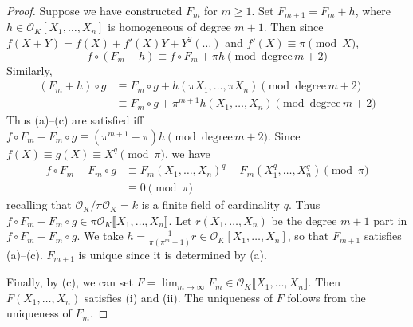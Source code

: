 \documentclass[11pt]{article}
\theoremstyle{definition}
\theoremstyle{plain}
\theoremstyle{remark}
\newcommand{\cO}{\mathcal{O}}
\begin{document}
\begin{proof}
    Suppose we have constructed $F_m$ for $m \ge 1$. Set $F_{m+1} = F_m + h$, where $h \in \cO_K[X_1, \ldots, X_n]$ is homogeneous of degree $m+1$. Then since $f(X+Y) = f(X) + f'(X) Y + Y^2 (\ldots)$ and $f'(X) \equiv \pi \pmod{X}$,
    \begin{equation*}
        f \circ (F_m + h) \equiv f \circ F_m + \pi h \pmod{\mathrm{degree}\,m+2}
    \end{equation*}
    Similarly,
    \begin{align*}
        (F_m + h) \circ g
        &\equiv F_m \circ g + h(\pi X_1, \ldots, \pi X_n) \pmod{\mathrm{degree}\,m+2}\\
        &\equiv F_m \circ g + \pi^{m+1} h(X_1, \ldots, X_n) \pmod{\mathrm{degree}\,m+2}
    \end{align*}
    Thus (a)--(c) are satisfied iff $f \circ F_m - F_m \circ g \equiv (\pi^{m+1} - \pi) h \pmod{\mathrm{degree}\,m+2}$. Since $f(X) \equiv g(X) \equiv X^q \pmod{\pi}$, we have
    \begin{align*}
        f \circ F_m - F_m \circ g
        &\equiv F_m(X_1, \ldots, X_n)^q - F_m(X_1^q, \ldots, X_n^q) \pmod{\pi}\\
        &\equiv 0 \pmod{\pi}
    \end{align*}
    recalling that $\cO_K/\pi \cO_K = k$ is a finite field of cardinality $q$. Thus $f \circ F_m - F_m \circ g \in \pi \cO_K \llbracket X_1, \ldots, X_n \rrbracket$. Let $r(X_1, \ldots, X_n)$ be the degree $m+1$ part in $f \circ F_m - F_m \circ g$. We take $h = \frac{1}{\pi(\pi^m-1)} r \in \cO_K[X_1, \ldots, X_n]$, so that $F_{m+1}$ satisfies (a)--(c). $F_{m+1}$ is unique since it is determined by (a).

    Finally, by (c), we can set $F = \lim_{m \to \infty} F_m \in \cO_K \llbracket X_1, \ldots, X_n \rrbracket$. Then $F(X_1, \ldots, X_n)$ satisfies (i) and (ii). The uniqueness of $F$ follows from the uniqueness of $F_m$.
\end{proof}
\end{document}
